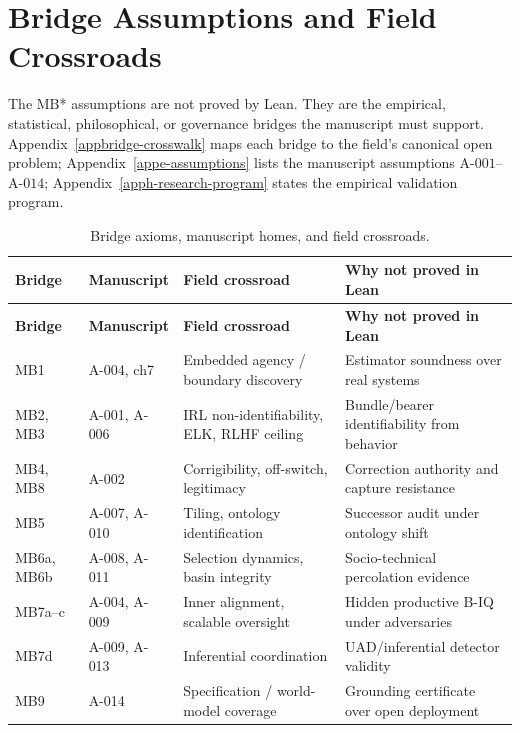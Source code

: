 \section{Bridge Assumptions and Field Crossroads}
\label{sec:appi-bridge-assumptions}

The \(\text{MB}\)* assumptions are not proved by Lean.
They are the empirical, statistical, philosophical, or governance bridges the manuscript must support.
Appendix~\ref{appbridge-crosswalk} maps each bridge to the field's canonical open problem; Appendix~\ref{appe-assumptions} lists the manuscript assumptions \(\text{A-001}\)--\(\text{A-014}\); Appendix~\ref{apph-research-program} states the empirical validation program.

\renewcommand{\arraystretch}{1.18}
\begin{longtable}{@{}p{}p{}p{}p{}@{}}
\caption{Bridge axioms, manuscript homes, and field crossroads.}\label{tab:appi-bridge-crossroads}\\
\toprule
\textbf{Bridge} & \textbf{Manuscript} & \textbf{Field crossroad} & \textbf{Why not proved in Lean} \\
\midrule
\endfirsthead
\toprule
\textbf{Bridge} & \textbf{Manuscript} & \textbf{Field crossroad} & \textbf{Why not proved in Lean} \\
\midrule
\endhead
\bottomrule
\endfoot
MB1 & A-004, ch7 & Embedded agency / boundary discovery & Estimator soundness over real systems \\
MB2, MB3 & A-001, A-006 & IRL non-identifiability, ELK, RLHF ceiling & Bundle/bearer identifiability from behavior \\
MB4, MB8 & A-002 & Corrigibility, off-switch, legitimacy & Correction authority and capture resistance \\
MB5 & A-007, A-010 & Tiling, ontology identification & Successor audit under ontology shift \\
MB6a, MB6b & A-008, A-011 & Selection dynamics, basin integrity & Socio-technical percolation evidence \\
MB7a--c & A-004, A-009 & Inner alignment, scalable oversight & Hidden productive B-IQ under adversaries \\
MB7d & A-009, A-013 & Inferential coordination & UAD/inferential detector validity \\
MB9 & A-014 & Specification / world-model coverage & Grounding certificate over open deployment \\
\end{longtable}
\renewcommand{\arraystretch}{1.0}

